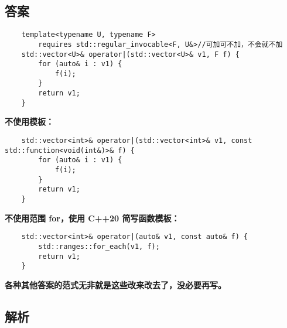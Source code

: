 

\subsection{答案}

\begin{verbatim}
    template<typename U, typename F>
        requires std::regular_invocable<F, U&>//可加可不加，不会就不加
    std::vector<U>& operator|(std::vector<U>& v1, F f) {
        for (auto& i : v1) {
            f(i);
        }
        return v1;
    }
\end{verbatim}

\textbf{不使用模板：}

\begin{verbatim}
    std::vector<int>& operator|(std::vector<int>& v1, const std::function<void(int&)>& f) {
        for (auto& i : v1) {
            f(i);
        }
        return v1;
    }
\end{verbatim}

\textbf{不使用范围 for，使用 C++20 简写函数模板：}

\begin{verbatim}
    std::vector<int>& operator|(auto& v1, const auto& f) {
        std::ranges::for_each(v1, f);
        return v1;
    }
\end{verbatim}

\textbf{各种其他答案的范式无非就是这些改来改去了，没必要再写。}

\subsection{解析}
